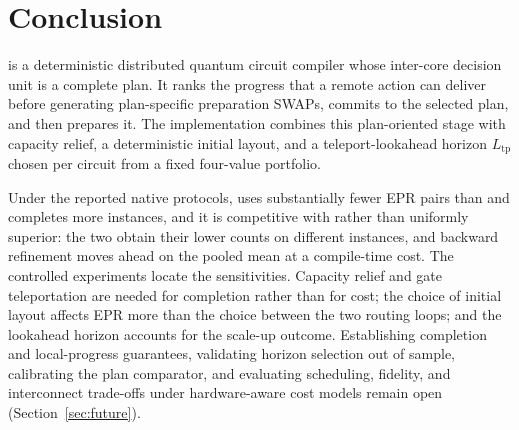 \section{Conclusion}
\label{sec:conclusion}

\PORTER{} is a deterministic distributed quantum circuit compiler whose
inter-core decision unit is a complete plan. It ranks the progress that a
remote action can deliver before generating plan-specific preparation SWAPs,
commits to the selected plan, and then prepares it. The implementation
combines this plan-oriented stage with capacity relief, a deterministic
initial layout, and a teleport-lookahead horizon $L_\mathrm{tp}$ chosen
per circuit from a fixed four-value portfolio.

Under the reported native protocols, \PORTER{} uses substantially fewer EPR
pairs than \TeleSABRE{} and completes more instances, and it is competitive
with \dSABRE{} rather than uniformly superior: the two obtain their lower
counts on different instances, and backward refinement moves \PORTER{} ahead
on the pooled mean at a compile-time cost. The controlled experiments locate
the sensitivities. Capacity relief and gate teleportation are needed for
completion rather than for cost; the choice of initial layout affects EPR
more than the choice between the two routing loops; and the lookahead horizon
accounts for the scale-up outcome. Establishing completion and local-progress
guarantees, validating horizon selection out of sample, calibrating the plan
comparator, and evaluating scheduling, fidelity, and interconnect trade-offs
under hardware-aware cost models remain open
(Section~\ref{sec:future}).
